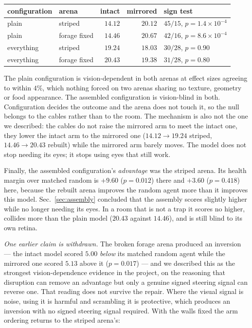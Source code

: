 \documentclass[10pt,twoside]{article}
\begin{document}
\begin{center}
\small
\begin{tabular}{llrrl}
\toprule
configuration & arena & intact & mirrored & sign test\\
\midrule
plain      & striped      & $14.12$ & $20.12$ & $45/15$, $p=1.4\times10^{-4}$\\
plain      & forage fixed & $14.46$ & $20.67$ & $42/16$, $p=8.6\times10^{-4}$\\
everything & striped      & $19.24$ & $18.03$ & $30/28$, $p=0.90$\\
everything & forage fixed & $20.43$ & $19.38$ & $31/28$, $p=0.80$\\
\bottomrule
\end{tabular}
\end{center}

The plain configuration is vision-dependent in both arenas at effect sizes
agreeing to within $4\%$, which nothing forced on two arenas sharing no texture,
geometry or food appearance. The assembled configuration is vision-blind in
both. Configuration decides the outcome and the arena does not touch it, so the
null belongs to the cables rather than to the room. The mechanism is also not
the one we described: the cables do not raise the mirrored arm to meet the
intact one, they lower the intact arm to the mirrored one ($14.12\to19.24$
striped, $14.46\to20.43$ rebuilt) while the mirrored arm barely moves. The model
does not stop needing its eyes; it stops using eyes that still work.

Finally, the assembled configuration's \emph{advantage} was the striped arena.
Its health margin over matched random is $+9.60$ ($p=0.012$) there and $+3.60$
($p=0.418$) here, because the rebuilt arena improves the random agent more than
it improves this model. Sec.~\ref{sec:assembly} concluded that the assembly
scores slightly higher while no longer needing its eyes. In a room that is not a
trap it scores no higher, collides more than the plain model ($20.43$ against
$14.46$), and is still blind to its own retina.

\emph{One earlier claim is withdrawn.} The broken forage arena produced an
inversion --- the intact model scored $5.00$ \emph{below} its matched random
agent while the mirrored one scored $5.13$ above it ($p=0.017$) --- and we
described this as the strongest vision-dependence evidence in the project, on
the reasoning that disruption can remove an advantage but only a genuine signed
steering signal can reverse one. That reading does not survive the repair. Where
the visual signal is noise, using it is harmful and scrambling it is protective,
which produces an inversion with no signed steering signal required. With the
walls fixed the arm ordering returns to the striped arena's:
\end{document}

